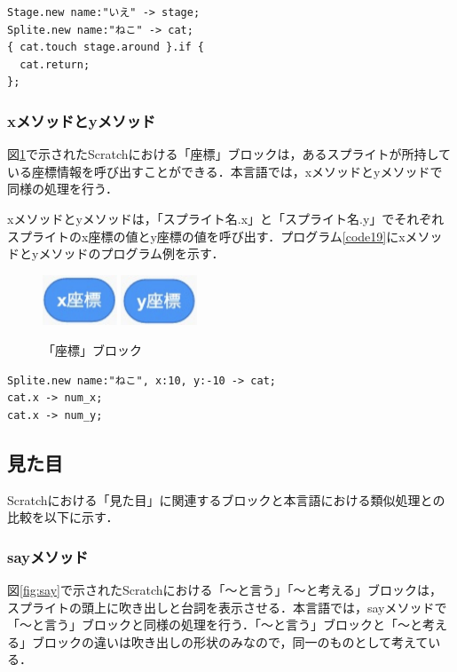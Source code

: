 \documentclass[10pt,a4j]{ltjsarticle}
\begin{document}
\begin{lstlisting}[caption=returnメソッドのプログラム例, label=code18]
Stage.new name:"いえ" -> stage;
Splite.new name:"ねこ" -> cat;
{ cat.touch stage.around }.if {
  cat.return;
};
\end{lstlisting}

\subsubsection{xメソッドとyメソッド}
図\ref{fig:xy}で示されたScratchにおける「座標」ブロックは，あるスプライトが所持している座標情報を呼び出すことができる．本言語では，xメソッドとyメソッドで同様の処理を行う．

xメソッドとyメソッドは，「スプライト名.x」と「スプライト名.y」でそれぞれスプライトのx座標の値とy座標の値を呼び出す．プログラム\ref{code19}にxメソッドとyメソッドのプログラム例を示す．

\begin{figure}[H]
  \centering
  \includegraphics[height=15mm]{images/x.pdf} 
  \includegraphics[height=15mm]{images/y.pdf} 
  \caption{「座標」ブロック}
  \label{fig:xy}
\end{figure}

\begin{lstlisting}[caption=xメソッドとyメソッドのプログラム例, label=code19]
Splite.new name:"ねこ", x:10, y:-10 -> cat;
cat.x -> num_x;
cat.x -> num_y;
\end{lstlisting}
\subsection{見た目}
Scratchにおける「見た目」に関連するブロックと本言語における類似処理との比較を以下に示す．

\subsubsection{sayメソッド}
図\ref{fig:say}で示されたScratchにおける「〜と言う」「〜と考える」ブロックは，スプライトの頭上に吹き出しと台詞を表示させる．本言語では，sayメソッドで「〜と言う」ブロックと同様の処理を行う．「〜と言う」ブロックと「〜と考える」ブロックの違いは吹き出しの形状のみなので，同一のものとして考えている．
\end{document}
